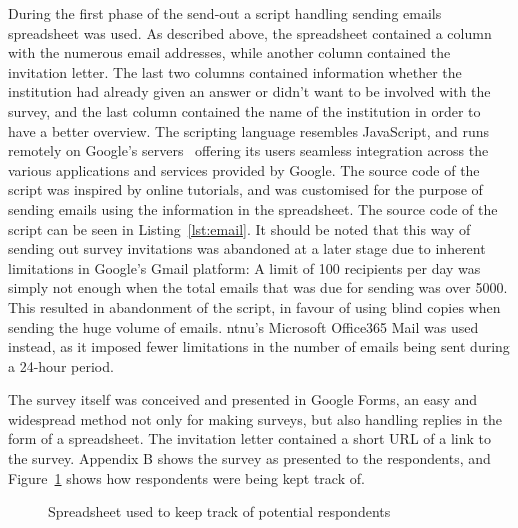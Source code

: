 During the first phase of the send-out a script handling sending emails spreadsheet was used. As described above, the spreadsheet contained a column with the numerous email addresses, while another column contained the invitation letter. The last two columns contained information whether the institution had already given an answer or didn't want to be involved with the survey, and the last column contained the name of the institution in order to have a better overview. The scripting language resembles JavaScript, and runs remotely on Google's servers~\cite{google2016} offering its users seamless integration across the various applications and services provided by Google. The source code of the script was inspired by online tutorials, and was customised for the purpose of sending emails using the information in the spreadsheet. The source code of the script can be seen in Listing~\ref{lst:email}. It should be noted that this way of sending out survey invitations was abandoned at a later stage due to inherent limitations in Google's Gmail platform: A limit of 100 recipients per day was simply not enough when the total emails that was due for sending was over 5000. This resulted in abandonment of the script, in favour of using blind copies when sending the huge volume of emails. \gls{ntnu}'s Microsoft Office365 Mail was used instead, as it imposed fewer limitations in the number of emails being sent during a 24-hour period.


The survey itself was conceived and presented in Google Forms, an easy and widespread method not only for making surveys, but also handling replies in the form of a spreadsheet. The invitation letter contained a short URL of a link to the survey. Appendix B shows the survey as presented to the respondents, and Figure~\ref{fig:contactsheet} shows how respondents were being kept track of.


\begin{figure}
    \centering
    \caption{Spreadsheet used to keep track of potential respondents}
    \label{fig:contactsheet}
\end{figure}

